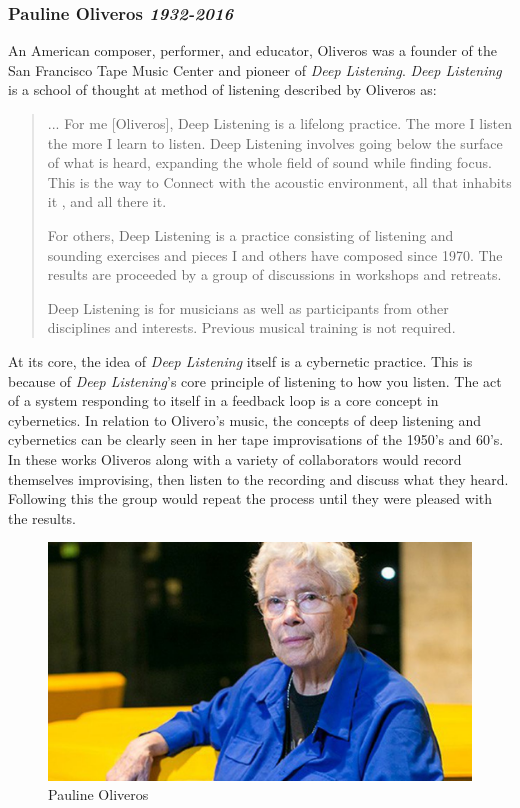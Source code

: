 \subsubsection{Pauline Oliveros \textit{1932-2016}} %
An American composer, performer, and educator, Oliveros was a founder of the San Francisco Tape Music Center and pioneer of\textit{ Deep Listening}\cite{HolmesElectronicMusic2020}. \textit{Deep Listening} is a school of thought at method of listening described by Oliveros as:

\begin{quote}
    ... For me [Oliveros], Deep Listening is a lifelong practice. The more I listen the more I learn to listen. Deep Listening involves going below the surface of what is heard, expanding the whole field of sound while finding focus. This is the way to Connect with the acoustic environment, all that inhabits it , and all there it.

    For others, Deep Listening is a practice consisting of listening and sounding exercises and pieces I and others have composed since 1970. The results are proceeded by a group of discussions in workshops and retreats. 

    Deep Listening is for musicians as well as participants from other disciplines and interests. Previous musical training is not required\cite{cultureandHumanity2002}.
\end{quote}

At its core, the idea of \textit{Deep Listening} itself is a cybernetic practice\cite{gordosOliverosCybernetics}. This is because of \textit{Deep Listening}'s core principle of listening to how you listen. The act of a system responding to itself in a feedback loop is a core concept in cybernetics. In relation to Olivero's music, the concepts of deep listening and cybernetics can be clearly seen in her tape improvisations of the 1950's and 60's. In these works Oliveros along with a variety of collaborators would record themselves improvising, then listen to the recording and discuss what they heard. Following this the group would repeat the process until they were pleased with the results\cite{gordosOliverosCybernetics}. 

\begin{figure}
    \centering %
    \includegraphics[scale=0.25]{diagrams/oliveros.jpg}
    \caption{Pauline Oliveros}
    \label{fig:oliverosHS}
\end{figure}

